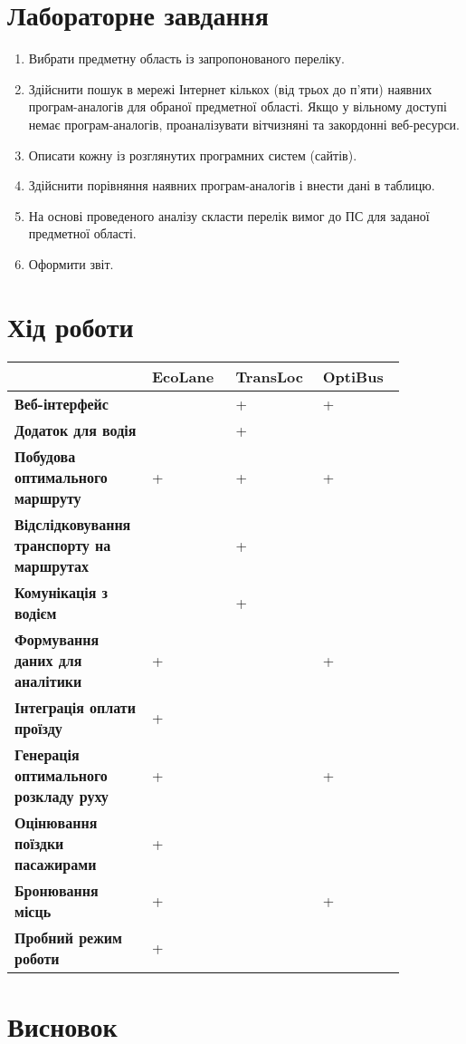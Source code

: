 \documentclass[14pt]{extreport}
\begin{document}
\begin{normalsize}
	\section*{Лабораторне завдання}
	\begin{enumerate}
		\item Вибрати предметну область із запропонованого переліку.
		\item Здійснити пошук в мережі Інтернет кількох (від трьох до п'яти) наявних
		програм-аналогів для обраної предметної області. Якщо у вільному доступі немає
		програм-аналогів, проаналізувати вітчизняні та закордонні веб-ресурси.
		\item Описати кожну із розглянутих програмних систем (сайтів).
		\item Здійснити порівняння наявних програм-аналогів і внести дані в таблицю.
		\item На основі проведеного аналізу скласти перелік вимог до ПС для заданої
		предметної області.
		\item Оформити звіт.
	\end{enumerate}
	
	\section*{Хід роботи}
	
	\begin{table}[H]
		\centering
		\renewcommand*\arraystretch{1.3}
		\begin{tabular}{|m{0.26\linewidth}|m{0.20\linewidth}|m{0.2\linewidth}|m{0.2\linewidth}|}
			\hline
			 & \textbf{EcoLane} & \textbf{TransLoc} & \textbf{OptiBus} \\\hline
			\textbf{Веб-інтерфейс} & & + & + \\\hline
			\textbf{Додаток для водія} & & + & \\\hline
			\textbf{Побудова оптимального маршруту} & + & + & + \\\hline
			\textbf{Відслідковування транспорту на маршрутах} & & + & \\\hline
			\textbf{Комунікація з водієм} & & + & \\\hline
			\textbf{Формування даних для аналітики} & + & & + \\\hline
			\textbf{Інтеграція оплати проїзду} & + & & \\\hline
			\textbf{Генерація оптимального розкладу руху} & + & & + \\\hline
			\textbf{Оцінювання поїздки пасажирами} & + & & \\\hline
			\textbf{Бронювання місць} & + & & + \\\hline
			\textbf{Пробний режим роботи} & + & & \\\hline
		\end{tabular}
	\end{table}

	\section*{Висновок}
	 
\end{normalsize}
\end{document}
